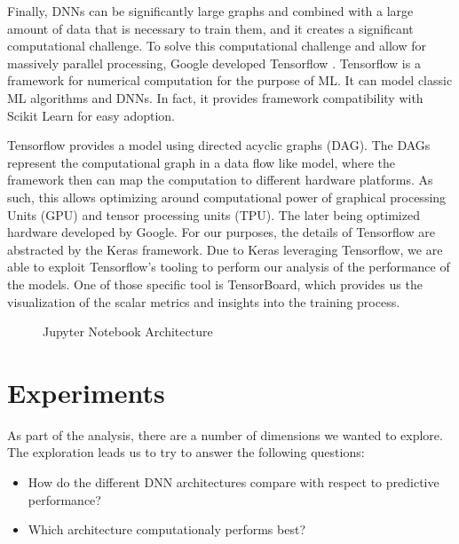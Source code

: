 \documentclass[11pt]{article}
\begin{document}
Finally, DNNs can be significantly large graphs and combined with a large amount of data that is necessary to train them, and it creates a significant computational challenge. To solve this computational challenge and allow for massively parallel processing, Google developed Tensorflow \cite{Agarwal2015TensorFlow:Systems}. Tensorflow is a framework for numerical computation for the purpose of ML. It can model classic ML algorithms and DNNs. In fact, it provides framework compatibility with Scikit Learn for easy adoption.

Tensorflow provides a model using directed acyclic graphs (DAG). The DAGs represent the computational graph in a data flow like model, where the framework then can map the computation to different hardware platforms. As such, this allows optimizing around computational power of graphical processing Units (GPU) and tensor processing units (TPU). The later being optimized hardware developed by Google. For our purposes, the details of Tensorflow are abstracted by the Keras framework. Due to Keras leveraging Tensorflow, we are able to exploit Tensorflow's tooling to perform our analysis of the performance of the models. One of those specific tool is TensorBoard, which provides us the visualization of the scalar metrics and insights into the training process.

\begin{figure}[!ht]
	\centering
	\caption{Jupyter Notebook Architecture}
	\label{fig:jupyter-architecture}
\end{figure}

\section{Experiments} \label{sec:experiments}

As part of the analysis, there are a number of dimensions we wanted to explore. The exploration leads us to try to answer the following questions:
\begin{itemize}
\item How do the different DNN architectures compare with respect to predictive performance?
\item Which architecture computationaly performs best?
\end{itemize}
\end{document}
